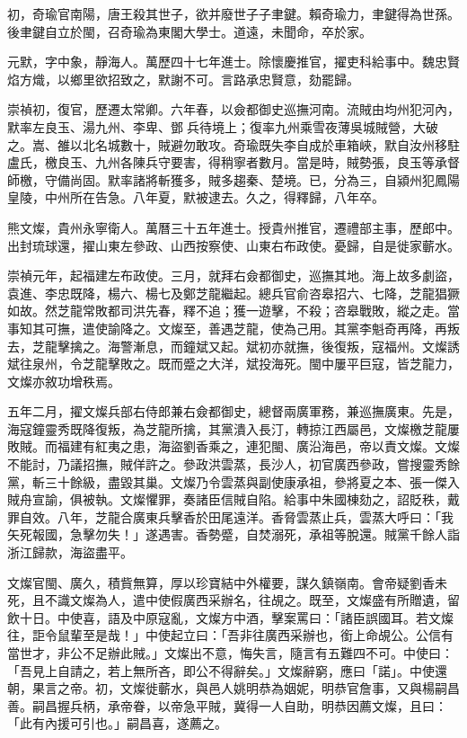 \begin{pinyinscope}
初，奇瑜官南陽，唐王殺其世子，欲并廢世子子聿鍵。賴奇瑜力，聿鍵得為世孫。後聿鍵自立於閩，召奇瑜為東閣大學士。道遠，未聞命，卒於家。

元默，字中象，靜海人。萬歷四十七年進士。除懷慶推官，擢吏科給事中。魏忠賢焰方熾，以鄉里欲招致之，默謝不可。言路承忠賢意，劾罷歸。

崇禎初，復官，歷遷太常卿。六年春，以僉都御史巡撫河南。流賊由均州犯河內，默率左良玉、湯九州、李卑、鄧兵待境上；復率九州乘雪夜薄吳城賊營，大破之。嵩、雒以北名城數十，賊避勿敢攻。奇瑜既失李自成於車箱峽，默自汝州移駐盧氏，檄良玉、九州各陳兵守要害，得稍寧者數月。當是時，賊勢張，良玉等承督師檄，守備尚固。默率諸將斬獲多，賊多趨秦、楚境。已，分為三，自潁州犯鳳陽皇陵，中州所在告急。八年夏，默被逮去。久之，得釋歸，八年卒。

熊文燦，貴州永寧衛人。萬曆三十五年進士。授貴州推官，遷禮部主事，歷郎中。出封琉球還，擢山東左參政、山西按察使、山東右布政使。憂歸，自是徙家蘄水。

崇禎元年，起福建左布政使。三月，就拜右僉都御史，巡撫其地。海上故多劇盜，袁進、李忠既降，楊六、楊七及鄭芝龍繼起。總兵官俞咨皋招六、七降，芝龍猖獗如故。然芝龍常敗都司洪先春，釋不追；獲一遊擊，不殺；咨皋戰敗，縱之走。當事知其可撫，遣使諭降之。文燦至，善遇芝龍，使為己用。其黨李魁奇再降，再叛去，芝龍擊擒之。海警漸息，而鐘斌又起。斌初亦就撫，後復叛，寇福州。文燦誘斌往泉州，令芝龍擊敗之。既而蹙之大洋，斌投海死。閩中屢平巨寇，皆芝龍力，文燦亦敘功增秩焉。

五年二月，擢文燦兵部右侍郎兼右僉都御史，總督兩廣軍務，兼巡撫廣東。先是，海寇鐘靈秀既降復叛，為芝龍所擒，其黨潰入長汀，轉掠江西屬邑，文燦檄芝龍屢敗賊。而福建有紅夷之患，海盜劉香乘之，連犯閩、廣沿海邑，帝以責文燦。文燦不能討，乃議招撫，賊佯許之。參政洪雲蒸，長沙人，初官廣西參政，嘗搜靈秀餘黨，斬三十餘級，盡毀其巢。文燦乃令雲蒸與副使康承祖，參將夏之本、張一傑入賊舟宣諭，俱被執。文燦懼罪，奏諸臣信賊自陷。給事中朱國棟劾之，詔貶秩，戴罪自效。八年，芝龍合廣東兵擊香於田尾遠洋。香脅雲蒸止兵，雲蒸大呼曰：「我矢死報國，急擊勿失！」遂遇害。香勢蹙，自焚溺死，承祖等脫還。賊黨千餘人詣浙江歸款，海盜盡平。

文燦官閩、廣久，積貲無算，厚以珍寶結中外權要，謀久鎮嶺南。會帝疑劉香未死，且不識文燦為人，遣中使假廣西采辦名，往覘之。既至，文燦盛有所贈遺，留飲十日。中使喜，語及中原寇亂，文燦方中酒，擊案罵曰：「諸臣誤國耳。若文燦往，詎令鼠輩至是哉！」中使起立曰：「吾非往廣西采辦也，銜上命覘公。公信有當世才，非公不足辦此賊。」文燦出不意，悔失言，隨言有五難四不可。中使曰：「吾見上自請之，若上無所吝，即公不得辭矣。」文燦辭窮，應曰「諾」。中使還朝，果言之帝。初，文燦徙蘄水，與邑人姚明恭為姻妮，明恭官詹事，又與楊嗣昌善。嗣昌握兵柄，承帝眷，以帝急平賊，冀得一人自助，明恭因薦文燦，且曰：「此有內援可引也。」嗣昌喜，遂薦之。


\end{pinyinscope}
